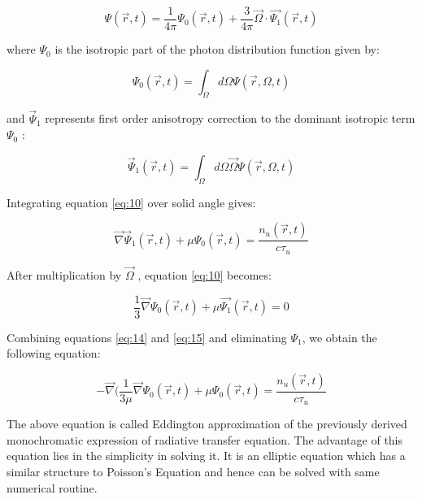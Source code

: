 \documentclass{article}
\begin{document}
\begin{equation} \label{eq:11}
\Psi(\vec{r},t) = \frac{1}{4\pi}\Psi_0(\vec{r},t) + \frac{3}{4\pi}\vec{\Omega} \cdot \vec{\Psi_1}(\vec{r},t) 
\end{equation} 

where $\Psi_0$ is the isotropic part of the photon distribution function given by:

\begin{equation}
\Psi_0(\vec{r},t) = \int_{\Omega}d\Omega\Psi(\vec{r},\Omega,t) 
\end{equation} 

and $\vec{\Psi}_1$ represents first order anisotropy correction to the dominant isotropic term $\Psi_0$ :

\begin{equation}
\vec{\Psi}_1(\vec{r},t) = \int_{\Omega}d\Omega \vec{\Omega}\Psi(\vec{r},\Omega,t) 
\end{equation} 

Integrating equation \ref{eq:10} over solid angle gives:

\begin{equation} \label{eq:14}
\vec{\nabla} \vec{\Psi}_1(\vec{r},t) + \mu\Psi_0(\vec{r},t) = \frac{n_u (\vec{r},t)}{c \tau_{u}}
\end{equation}

After multiplication by $\vec{\Omega}$ , equation \ref{eq:10} becomes:

\begin{equation} \label{eq:15}
\frac{1}{3}\vec{\nabla}\Psi_0(\vec{r},t) + \mu \vec{\Psi_1}(\vec{r},t) = 0
\end{equation} 

Combining equations \ref{eq:14} and \ref{eq:15} and eliminating $\Psi_1$, we obtain the following equation:

\begin{equation} 
-\vec{\nabla}(\frac{1}{3\mu} \vec{\nabla}\Psi_0(\vec{r},t) + \mu \Psi_0(\vec{r},t) = \frac{n_u (\vec{r},t)}{c \tau_{u}}
\end{equation} 

The above equation is called Eddington approximation of the previously derived monochromatic expression of radiative transfer equation. The advantage of this equation lies in the simplicity in solving it. It is an elliptic equation which has a similar structure to Poisson's Equation and hence can be solved with same numerical routine. 





\printbibliography
%
\end{document}
